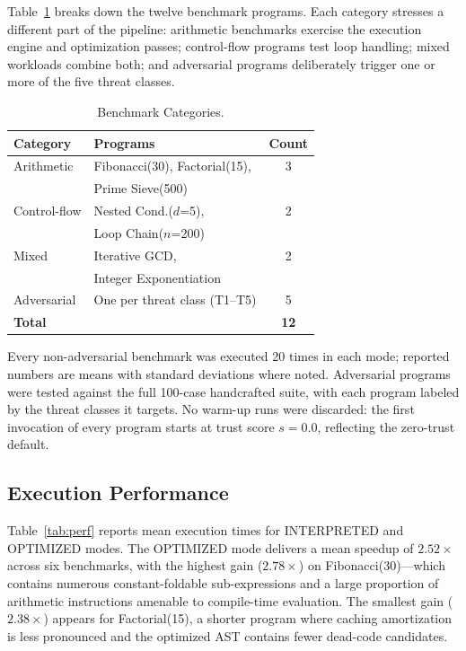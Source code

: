 \documentclass[conference]{IEEEtran}
\begin{document}
Table~\ref{tab:benchcat} breaks down the twelve benchmark
programs.  Each category stresses a different part of the
pipeline: arithmetic benchmarks exercise the execution engine
and optimization passes; control-flow programs test loop
handling; mixed workloads combine both; and adversarial programs
deliberately trigger one or more of the five threat classes.

\begin{table}[t]
\caption{Benchmark Categories.}
\label{tab:benchcat}
\centering
\renewcommand{\arraystretch}{1.18}
\small
\begin{tabular}{@{} l l c @{}}
\toprule
\textbf{Category} & \textbf{Programs} & \textbf{Count} \\
\midrule
Arithmetic    & Fibonacci(30), Factorial(15),   & 3 \\
              & Prime Sieve(500)                &   \\
Control-flow  & Nested Cond.($d$=5),            & 2 \\
              & Loop Chain($n$=200)             &   \\
Mixed         & Iterative GCD,                  & 2 \\
              & Integer Exponentiation          &   \\
Adversarial   & One per threat class (T1--T5)   & 5 \\
\midrule
\textbf{Total} &                                & \textbf{12} \\
\bottomrule
\end{tabular}
\end{table}

Every non-adversarial benchmark was executed 20 times in each
mode; reported numbers are means with standard deviations where
noted.  Adversarial programs were tested against the full
100-case handcrafted suite, with each program labeled by the
threat classes it targets.  No warm-up runs were discarded: the
first invocation of every program starts at trust score
$s = 0.0$, reflecting the zero-trust default.

\subsection{Execution Performance}

Table~\ref{tab:perf} reports mean execution times for INTERPRETED and
OPTIMIZED modes. The OPTIMIZED mode delivers a mean speedup of
$2.52\times$ across six benchmarks, with the highest gain
($2.78\times$) on Fibonacci(30)—which contains numerous
constant-foldable sub-expressions and a large proportion of
arithmetic instructions amenable to compile-time evaluation. The
smallest gain ($2.38\times$) appears for Factorial(15), a shorter
program where caching amortization is less pronounced and the
optimized AST contains fewer dead-code candidates.
\end{document}
